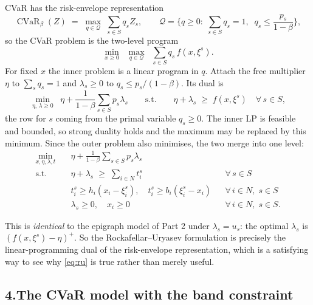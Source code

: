 \documentclass[11pt]{article}
\DeclareMathOperator*{\minimize}{min}
\DeclareMathOperator*{\maximize}{max}
\DeclareMathOperator{\CVaR}{CVaR}
\theoremstyle{definition}
\begin{document}
CVaR has the risk-envelope representation
\begin{equation}
  \CVaR_\beta(Z) \;=\; \max_{q \in \mathcal{Q}}\; \sum_{s\in S} q_s Z_s,
  \qquad
  \mathcal{Q} = \Big\{ q \ge 0 :\; \sum_{s\in S} q_s = 1,\;\;
    q_s \le \frac{p_s}{1-\beta} \Big\},
  \label{eq:envelope}
\end{equation}
so the CVaR problem is the two-level program
\[
  \minimize_{x \ge 0} \;\; \maximize_{q \in \mathcal{Q}} \;\;
    \sum_{s\in S} q_s\, f(x,\xi^{s}).
\]
For fixed $x$ the inner problem is a linear program in $q$. Attach the
free multiplier $\eta$ to $\sum_s q_s = 1$ and $\lambda_s \ge 0$ to
$q_s \le p_s/(1-\beta)$. Its dual is
\[
  \minimize_{\eta,\,\lambda \ge 0} \;\;
    \eta + \frac{1}{1-\beta}\sum_{s\in S} p_s \lambda_s
  \qquad\text{s.t.}\qquad
  \eta + \lambda_s \;\ge\; f(x,\xi^{s}) \quad \forall\, s \in S,
\]
the row for $s$ coming from the primal variable $q_s \ge 0$. The inner LP
is feasible and bounded, so strong duality holds and the maximum may be
replaced by this minimum. Since the outer problem also minimises, the two
merge into one level:
\begin{align}
  \minimize_{x,\eta,\lambda,t} \quad
    & \eta + \frac{1}{1-\beta}\sum_{s\in S} p_s \lambda_s \\
  \text{s.t.}\quad
    & \eta + \lambda_s \;\ge\; \sum_{i \in N} t^{s}_i
      && \forall\, s \in S \\
    & t^{s}_i \ge h_i(x_i - \xi^{s}_i),\quad
      t^{s}_i \ge b_i(\xi^{s}_i - x_i) && \forall\, i \in N,\; s \in S \\
    & \lambda_s \ge 0,\quad x_i \ge 0 && \forall\, i \in N,\; s \in S .
\end{align}

This is \emph{identical} to the epigraph model of Part 2 under
$\lambda_s = u_s$: the optimal $\lambda_s$ is
$(f(x,\xi^{s})-\eta)^{+}$. So the Rockafellar--Uryasev formulation is
precisely the linear-programming dual of the risk-envelope
representation, which is a satisfying way to see why \eqref{eq:ru} is
true rather than merely useful.

\subsection*{4.\quad The CVaR model with the band constraint}
\end{document}
